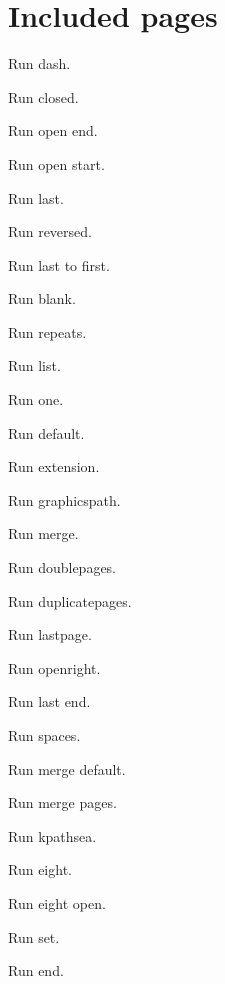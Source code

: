 \documentclass{article}
\begin{document}
\section{Included pages}
Run dash.


Run closed.


Run open end.


Run open start.


Run last.


Run reversed.


Run last to first.


Run blank.


Run repeats.


Run list.


Run one.


Run default.


Run extension.


Run graphicspath.


Run merge.

Run doublepages.


Run duplicatepages.


Run lastpage.


Run openright.


Run last end.


Run spaces.


Run merge default.

Run merge pages.

Run kpathsea.


Run eight.


Run eight open.


Run set.


Run end.
\end{document}

